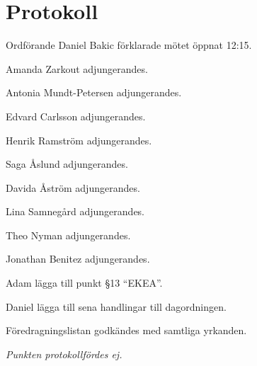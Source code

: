 \documentclass[10pt]{article}
\def\mo{Daniel Bakic}
\begin{document}
\section*{Protokoll}
\begin{paragrafer}
	Ordförande {\mo} förklarade mötet öppnat 12:15.

	{\valavmo}

	{\valavms}

	{\valavj}

	{\tosg}


	Amanda Zarkout adjungerandes.
	
	Antonia Mundt-Petersen adjungerandes.
	
	Edvard Carlsson adjungerandes.
	
	Henrik Ramström adjungerandes.
	
	Saga Åslund adjungerandes.
	
	Davida Åström adjungerandes.
	
	Lina Samnegård adjungerandes.
	
	Theo Nyman adjungerandes.
	
	Jonathan Benitez adjungerandes.
	

	Adam \ypa lägga till punkt \S13 ``EKEA''.

	Daniel \ypa lägga till sena handlingar till dagordningen.

	Föredragningslistan godkändes med samtliga yrkanden.


	\begin{fyllnadsval} %
	\end{fyllnadsval}

	\begin{paragrafer}
		\emph{Punkten protokollfördes ej.}


\end{paragrafer}
\end{paragrafer}
\end{document}
